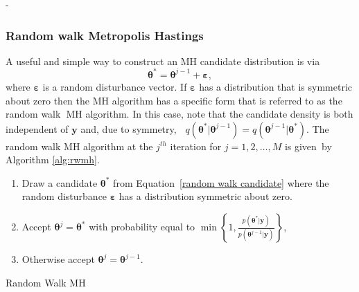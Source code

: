 -\documentclass[article]{jss}
\begin{document}
\subsubsection{Random walk Metropolis Hastings}


A useful and simple way to construct an MH candidate distribution is
via\begin{equation}
  \bm{\theta}^{\ast}=\bm{\theta}^{j-1}+\bm{\bm{\varepsilon}},\label{random
    walk candidate}\end{equation} where $\bm{\varepsilon}$ is a random
disturbance vector. If $\bm{\varepsilon}$ has a distribution that is
symmetric about zero then the MH algorithm has a specific form that is
referred to as the random walk\textbf{\ }MH algorithm. In this case,
note that the candidate density is both independent of $\bm{y}$ and,
due to symmetry, \textbf{\
}$q\left(\bm{\theta}^{\ast}|\bm{\theta}^{j-1}\right)=q\left(\bm{\theta}^{j-1}|\bm{\theta}^{\ast}\right)$.
The random walk MH algorithm at the $j^{th}$ iteration for
$j=1,2,\ldots,M$ is given\emph{\ }by Algorithm \ref{alg:rwmh}.

%
\begin{algorithm}[H]
  \begin{enumerate}
  \item Draw a candidate $\bm{\theta}^{\ast}$ from
    Equation~\ref{random walk candidate} where the random disturbance
    $\bm{\varepsilon}$ has a distribution symmetric about zero.
  \item Accept $\bm{\theta}^{j}=\bm{\theta}^{\ast}$ with probability
    equal to $\min\left\{
      1,\frac{p\left(\bm{\theta}^{\ast}|\bm{y}\right)}{p\left(\bm{\theta}^{j-1}|\bm{y}\right)}\right\}
    $,
  \item Otherwise accept $\bm{\theta}^{j}=\bm{\theta}^{j-1}.$
  \end{enumerate}
  \caption{Random Walk MH}
\label{alg:rwmh}
\end{algorithm}
\end{document}
